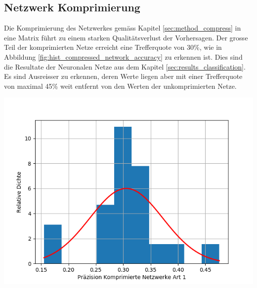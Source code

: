 \documentclass[Interploate_hadwritten_Digits.tex]{subfiles}
\begin{document}
	\subsection{Netzwerk Komprimierung}
	\label{sec:results_compression}
	Die Komprimierung des Netzwerkes gemäss Kapitel \ref{sec:method_compress} in eine Matrix führt zu einem starken Qualitätsverlust der Vorhersagen. Der grosse Teil der komprimierten Netze erreicht eine Trefferquote von 30\%, wie in Abbildung \ref{fig:hist_compressed_network_accuracy} zu erkennen ist. Dies sind die Resultate der Neuronalen Netze aus dem Kapitel \ref{sec:results_classification}. Es sind Ausreisser zu erkennen, deren Werte liegen aber mit einer Trefferquote von maximal 45\% weit entfernt von den Werten der unkomprimierten Netze.
	\begin{Figure}
		\centering
		\includegraphics[width=\linewidth]{img/results/histogram_compressed_network_accuracy.png}
		\label{fig:hist_compressed_network_accuracy}
	\end{Figure}
\end{document}
